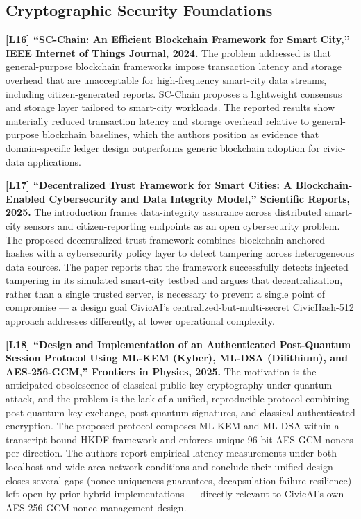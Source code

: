 \documentclass[conference]{IEEEtran}
\begin{document}
\subsection{Cryptographic Security Foundations}

\textbf{[L16] ``SC-Chain: An Efficient Blockchain Framework for Smart City,'' IEEE Internet of Things Journal, 2024.} The problem addressed is that general-purpose blockchain frameworks impose transaction latency and storage overhead that are unacceptable for high-frequency smart-city data streams, including citizen-generated reports. SC-Chain proposes a lightweight consensus and storage layer tailored to smart-city workloads. The reported results show materially reduced transaction latency and storage overhead relative to general-purpose blockchain baselines, which the authors position as evidence that domain-specific ledger design outperforms generic blockchain adoption for civic-data applications.

\textbf{[L17] ``Decentralized Trust Framework for Smart Cities: A Blockchain-Enabled Cybersecurity and Data Integrity Model,'' Scientific Reports, 2025.} The introduction frames data-integrity assurance across distributed smart-city sensors and citizen-reporting endpoints as an open cybersecurity problem. The proposed decentralized trust framework combines blockchain-anchored hashes with a cybersecurity policy layer to detect tampering across heterogeneous data sources. The paper reports that the framework successfully detects injected tampering in its simulated smart-city testbed and argues that decentralization, rather than a single trusted server, is necessary to prevent a single point of compromise --- a design goal CivicAI's centralized-but-multi-secret CivicHash-512 approach addresses differently, at lower operational complexity.

\textbf{[L18] ``Design and Implementation of an Authenticated Post-Quantum Session Protocol Using ML-KEM (Kyber), ML-DSA (Dilithium), and AES-256-GCM,'' Frontiers in Physics, 2025.} The motivation is the anticipated obsolescence of classical public-key cryptography under quantum attack, and the problem is the lack of a unified, reproducible protocol combining post-quantum key exchange, post-quantum signatures, and classical authenticated encryption. The proposed protocol composes ML-KEM and ML-DSA within a transcript-bound HKDF framework and enforces unique 96-bit AES-GCM nonces per direction. The authors report empirical latency measurements under both localhost and wide-area-network conditions and conclude their unified design closes several gaps (nonce-uniqueness guarantees, decapsulation-failure resilience) left open by prior hybrid implementations --- directly relevant to CivicAI's own AES-256-GCM nonce-management design.
\end{document}
